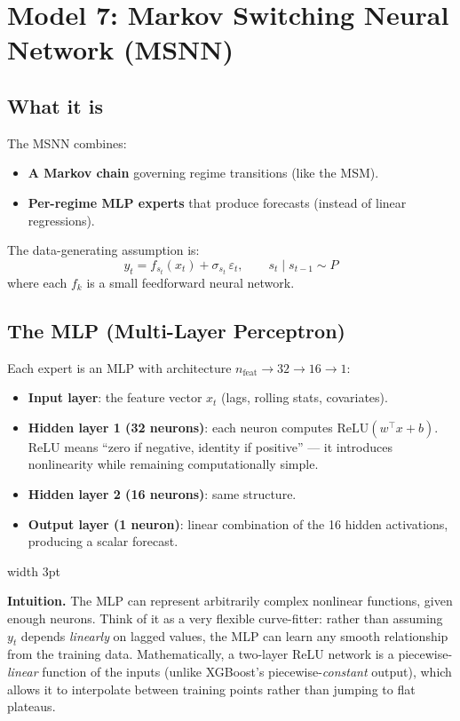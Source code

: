 \documentclass[11pt, a4paper]{article}
\newenvironment{intubox}{%
  \vspace{4pt}\par\noindent%
  {\color{darkblue}\vrule width 3pt}\hspace{6pt}%
  \begin{minipage}{\dimexpr\linewidth-9pt\relax}\vspace{2pt}%
}{%
  \vspace{2pt}\end{minipage}\par\vspace{4pt}%
}
\begin{document}
\section{Model 7: Markov Switching Neural Network (MSNN)}

\subsection{What it is}

The MSNN combines:
\begin{itemize}[itemsep=3pt]
  \item \textbf{A Markov chain} governing regime transitions (like the MSM).
  \item \textbf{Per-regime MLP experts} that produce forecasts (instead of
        linear regressions).
\end{itemize}

The data-generating assumption is:
\[
  y_t = f_{s_t}(x_t) + \sigma_{s_t}\,\varepsilon_t, \qquad s_{t}\mid s_{t-1}\sim P
\]
where each $f_k$ is a small feedforward neural network.

\subsection{The MLP (Multi-Layer Perceptron)}

Each expert is an MLP with architecture $n_\text{feat} \to 32 \to 16 \to 1$:

\begin{itemize}[itemsep=2pt]
  \item \textbf{Input layer}: the feature vector $x_t$ (lags, rolling stats, covariates).
  \item \textbf{Hidden layer 1 (32 neurons)}: each neuron computes $\text{ReLU}(w^\top x + b)$.
        ReLU means ``zero if negative, identity if positive'' --- it introduces
        nonlinearity while remaining computationally simple.
  \item \textbf{Hidden layer 2 (16 neurons)}: same structure.
  \item \textbf{Output layer (1 neuron)}: linear combination of the 16 hidden
        activations, producing a scalar forecast.
\end{itemize}

\begin{intubox}
\textbf{Intuition.}
The MLP can represent arbitrarily complex nonlinear functions, given enough
neurons. Think of it as a very flexible curve-fitter: rather than assuming
$y_t$ depends \emph{linearly} on lagged values, the MLP can learn any smooth
relationship from the training data. Mathematically, a two-layer ReLU network
is a piecewise-\emph{linear} function of the inputs (unlike XGBoost's
piecewise-\emph{constant} output), which allows it to interpolate between
training points rather than jumping to flat plateaus.
\end{intubox}
\end{document}
